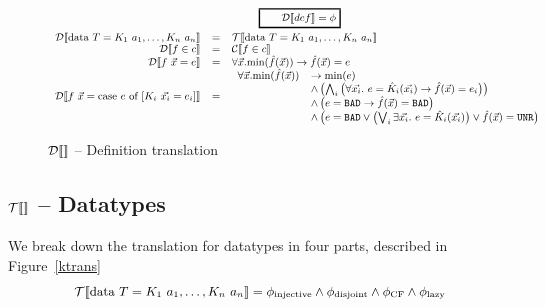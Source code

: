 \documentclass[preprint]{sigplanconf}
\begin{document}
\newcommand{\fullfxs}{\full{f}(\vec{x})}
\begin{figure}
\[
\begin{array}{rcl}
  \multicolumn{3}{c}{\ruleform{\dtrans{def} = \phi}} \\[2.5mm]
  \dtrans{\mbox{data } T = K_1~a_1, \dots, K_n~a_n} &=& \ttrans{\mbox{data } T = K_1~a_1, \dots, K_n~a_n} \\
  \dtrans{f \in c} &=& \ctrans{f \in c}\\
  \dtrans{f~\vec{x} = e} &=& \forall \vec{x}.\min{\fullfxs} 
                                              \to \fullfxs = e \\
   \dtrans{f~\vec{x} = \mbox{case } e \mbox{ of } [K_i~\vec{x_i} = e_i]}
    &=&
    \begin{array}{ll}
      \forall \vec{x}. \min{\fullfxs} 
      &\to \min{e} \\
      &\land \left(
        \bigwedge_i \left(
                      \forall \vec{x_i}.~e = \full{K}_i(\vec{x_i}) \to \fullfxs = e_i
                    \right)
             \right) \\
      &\land \left( e = \bad \to \fullfxs = \bad \right) \\
      &\land \left( e = \bad \lor 
                    \left(\bigvee_i \exists \vec{x_i}.~e = \full{K}_i(\vec{x_i}) \right) 
                    \lor \fullfxs = \unr
             \right) \\
    \end{array} 
\end{array}
\]
\caption{$\dtrans{}$ -- Definition translation}
 \label{fig:dtrans}
\end{figure}

\subsection{$\ttrans{}$ -- Datatypes}
We break down the translation for datatypes in four parts, described in Figure~\ref{ktrans}
$$\ttrans{\mbox{data } T = K_1~a_1, \dots, K_n~a_n} = \phiInjective \land \phiDisjoint \land \phiCF \land \phiLazy$$
\end{document}
